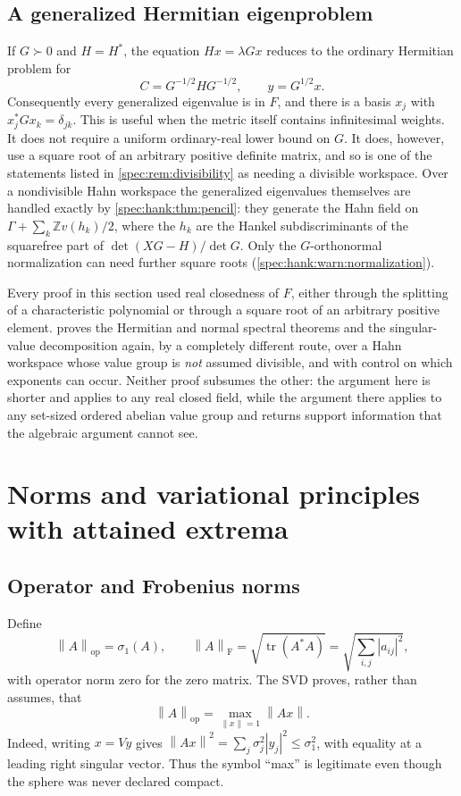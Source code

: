 \documentclass[11pt,a4paper]{article}
\numberwithin{equation}{section}
\theoremstyle{definition}
\theoremstyle{remark}
\newcommand{\Z}{\mathbb Z}
\newcommand{\tr}{\operatorname{tr}}
\newcommand{\op}{\mathrm{op}}
\newcommand{\Fr}{\mathrm F}
\newcommand{\norm}[1]{\left\lVert#1\right\rVert}
\begin{document}
\subsection{A generalized Hermitian eigenproblem}
If $G\succ0$ and $H=H^*$, the equation $Hx=\lambda Gx$ reduces to the
ordinary Hermitian problem for
\[
 C=G^{-1/2}HG^{-1/2},\qquad y=G^{1/2}x.
\]
Consequently every generalized eigenvalue is in $F$, and there is a basis
$x_j$ with $x_j^*Gx_k=\delta_{jk}$. This is useful when the metric itself
contains infinitesimal weights. It does not require a uniform ordinary-real
lower bound on $G$. It does, however, use a square root of an arbitrary
positive definite matrix, and so is one of the statements listed in
\cref{spec:rem:divisibility} as needing a divisible workspace. Over a
nondivisible Hahn workspace the generalized eigenvalues themselves are handled
exactly by \cref{spec:hank:thm:pencil}: they generate the Hahn field on
$\Gamma+\sum_k\Z v(h_k)/2$, where the $h_k$ are the Hankel subdiscriminants of
the squarefree part of $\det(XG-H)/\det G$. Only the $G$-orthonormal
normalization can need further square roots
(\cref{spec:hank:warn:normalization}).

Every proof in this section used real closedness of $F$, either through the
splitting of a characteristic polynomial or through a square root of an
arbitrary positive element.  proves the Hermitian and
normal spectral theorems and the singular-value decomposition again, by a
completely different route, over a Hahn workspace whose value group is
\emph{not} assumed divisible, and with control on which exponents can occur.
Neither proof subsumes the other: the argument here is shorter and applies
to any real closed field, while the argument there applies to any set-sized
ordered abelian value group and returns support information that the
algebraic argument cannot see.

\section{Norms and variational principles with attained extrema}\label{sec:minmax}

\subsection{Operator and Frobenius norms}
Define
\[
 \norm A_{\op}=\sigma_1(A),\qquad
 \norm A_{\Fr}=\sqrt{\tr(A^*A)}
             =\sqrt{\sum_{i,j}|a_{ij}|^2},
\]
with operator norm zero for the zero matrix. The SVD proves, rather than
assumes, that
\begin{equation}\label{eq:opmax}
 \norm A_{\op}=\max_{\norm x=1}\norm{Ax}.
\end{equation}
Indeed, writing $x=Vy$ gives
$\norm{Ax}^2=\sum_j\sigma_j^2|y_j|^2\le\sigma_1^2$, with equality at a
leading right singular vector. Thus the symbol ``max'' is legitimate even
though the sphere was never declared compact.
\end{document}
